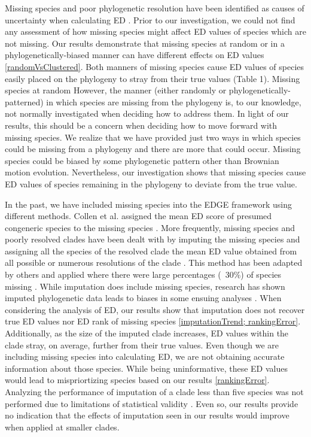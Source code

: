\documentclass[12pt,english]{article}
\begin{document}
Missing species and poor phylogenetic resolution have been identified as causes
of uncertainty when calculating ED \autocite{Isaac2007}. Prior to our
investigation, we could not find any assessment of how missing species might
affect ED values of species which are not missing. Our results demonstrate that
missing species at random or in a phylogenetically-biased manner can have
different effects on ED values \ref{randomVsClustered}. Both manners of missing
species cause ED values of species easily placed on the phylogeny to stray from
their true values (Table 1). Missing species at random  However, the manner
(either randomly or phylogenetically-patterned) in which species are missing
from the phylogeny is, to our knowledge, not normally investigated when deciding
how to address them. In light of our results, this should be a concern when
deciding how to move forward with missing species. We realize that we have
provided just two ways in which species could be missing from a phylogeny and
there are more that could occur. Missing species could be biased by some
phylogenetic pattern other than Brownian motion evolution. Nevertheless, our
investigation shows that missing species cause ED values of species remaining in
the phylogeny to deviate from the true value.

In the past, we have included missing species into the EDGE framework using
different methods. Collen et al. assigned the mean ED score of presumed
congeneric species to the missing species \citeyear{Collen2011}. More
frequently, missing species and poorly resolved clades have been dealt with by
imputing the missing species and assigning all the species of the resolved
clade the mean ED value obtained from all possible or numerous resolutions of
the clade \autocite{Isaac2007; Isaac2012}. This method has been adapted by
others and applied where there were large percentages (~30\%) of species
missing \autocite{Jetz2014}. While imputation does include missing species,
research has shown imputed phylogenetic data leads to biases in some ensuing
analyses \autocite{Rabosky2014}. When considering the analysis of ED, our
results show that imputation does not recover true ED values nor ED rank of
missing species \ref{imputationTrend; rankingError}. Additionally, as the size
of the imputed clade increases, ED values within the clade stray, on average,
further from their true values. Even though we are including missing species
into calculating ED, we are not obtaining accurate information about those
species. While being uninformative, these ED values would lead to
mispriortizing species based on our results \ref{rankingError}. Analyzing the
performance of imputation of a clade less than five species was not performed
due to limitations of statistical validity \autocite{Crawley2012}. Even so, our
results provide no indication that the effects of imputation seen in our
results would improve when applied at smaller clades.
\end{document}
